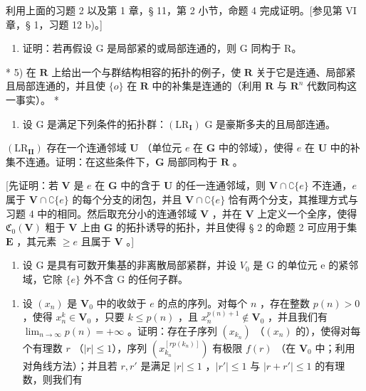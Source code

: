 利用上面的习题 2 以及第 1 章，§ 11，第 2 小节，命题 4 完成证明。{[}参见第 VI 章，§ 1，习题 12 b)。{]}

\begin{enumerate}
\def\labelenumi{\alph{enumi})}
\setcounter{enumi}{5}
\tightlist
\item
  证明：若再假设 G 是局部紧的或局部连通的，则 G 同构于 R。
\end{enumerate}

* 5) 在 \(\mathbf{R}\) 上给出一个与群结构相容的拓扑的例子，使 \(\mathbf{R}\) 关于它是连通、局部紧且局部连通的，并且使 \(\{o\}\) 在 \(\mathbf{R}\) 中的补集是连通的（利用 \(\mathbf{R}\) 与 \(\mathbf{R}^n\) 代数同构这一事实）。 *

\begin{enumerate}
\def\labelenumi{\arabic{enumi})}
\setcounter{enumi}{5}
\tightlist
\item
  设 G 是满足下列条件的拓扑群：\((\mathrm{LR}_{\mathbf{I}})\) G 是豪斯多夫的且局部连通。
\end{enumerate}

\((\mathrm{LR}_{\mathbf{II}})\) 存在一个连通邻域 \(\mathbf{U}\) （单位元 \(e\) 在 \(\mathbf{G}\) 中的邻域），使得 \(e\) 在 \(\mathbf{U}\) 中的补集不连通。证明：在这些条件下，\(\mathbf{G}\) 局部同构于 \(\mathbf{R}\) 。

{[}先证明：若 \(\mathbf{V}\) 是 \(e\) 在 \(\mathbf{G}\) 中的含于 \(\mathbf{U}\) 的任一连通邻域，则 \(\mathbf{V} \cap \complement\{e\}\) 不连通，\(e\) 属于 \(\mathbf{V} \cap \complement\{e\}\) 的每个分支的闭包，并且 \(\mathbf{V} \cap \complement\{e\}\) 恰有两个分支，其推理方式与习题 4 中的相同。然后取充分小的连通邻域 \(\mathbf{V}\) ，并在 \(\mathbf{V}\) 上定义一个全序，使得 \(\mathfrak{C}_0(\mathbf{V})\) 粗于 \(\mathbf{V}\) 上由 \(\mathbf{G}\) 的拓扑诱导的拓扑，并且使得 § 2 的命题 2 可应用于集 \(\mathbf{E}\) ，其元素 \(\geqslant e\) 且属于 \(\mathbf{V}\) 。{]}

\begin{enumerate}
\def\labelenumi{\arabic{enumi})}
\setcounter{enumi}{6}
\tightlist
\item
  设 G 是具有可数开集基的非离散局部紧群，并设 \(V_{0}\) 是 G 的单位元 e 的紧邻域，它除 \(\{e\}\) 外不含 G 的任何子群。
\end{enumerate}

\begin{enumerate}
\def\labelenumi{\alph{enumi})}
\tightlist
\item
  设 \((x_{n})\) 是 \(\mathbf{V}_{0}\) 中的收敛于 \(e\) 的点的序列。对每个 \(n\) ，存在整数 \(p(n) > 0\) ，使得 \(x_{n}^{k} \in \mathbf{V}_{0}\) ，只要 \(k \leqslant p(n)\) ，且 \(x_{n}^{p(n)+1} \notin \mathbf{V}_{0}\) ，并且我们有 \(\lim_{n \to \infty} p(n) = +\infty\) 。证明：存在子序列 \((x_{k_{n}})\) （\((x_{n})\) 的），使得对每个有理数 \(r\) （\(|r| \leqslant 1\)），序列 \((x_{k_{n}}^{[rp(k_{n})]})\) 有极限 \(f(r)\) （在 \(\mathbf{V}_{0}\) 中；利用对角线方法）；并且若 \(r, r'\) 是满足 \(|r| \leqslant 1\) ，\(|r'| \leqslant 1\) 与 \(|r + r'| \leqslant 1\) 的有理数，则我们有
\end{enumerate}

